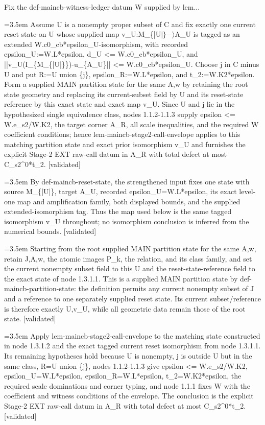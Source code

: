 \documentclass{article}
\newcommand{\step}[1]{\par\noindent\hangindent=3.5em\hangafter=1%
  \makebox[3.5em][l]{\textbf{#1.}}}
\newcommand{\steptag}[1]{\hfill{\small\textsf{[#1]}}}
\begin{document}
\begin{proofbox}{Fix the def-maincb-witness-ledger datum W supplied by lem...}
\step{1.3.1} Assume U is a nonempty proper subset of C and fix exactly one current reset state on U whose supplied map v\_U:M\_\{|U$|\}-\rangle$A\_U is tagged as an extended W.c0\_cb*epsilon\_U-isomorphism, with recorded epsilon\_U:=W.L*epsilon, d\_U <= W.c0\_cb*epsilon\_U, and ||v\_U(I\_\{M\_\{|U|\}\})-u\_\{A\_U\}|| <= W.c0\_cb*epsilon\_U. Choose j in C minus U and put R:=U union \{j\}, epsilon\_R:=W.L*epsilon, and t\_2:=W.K2*epsilon. Form a supplied MAIN partition state for the same A,w by retaining the root state geometry and replacing its current-subset field by U and its reset-state reference by this exact state and exact map v\_U. Since U and j lie in the hypothesized single equivalence class, nodes 1.1.2-1.1.3 supply epsilon <= W.e\_s2/W.K2, the target corner A\_R, all scale inequalities, and the required W coefficient conditions; hence lem-maincb-stage2-call-envelope applies to this matching partition state and exact prior isomorphism v\_U and furnishes the explicit Stage-2 EXT raw-call datum in A\_R with total defect at most C\_s2\textasciicircum{}0*t\_2. \steptag{validated} \\[6pt]
\step{1.3.1.1} By def-maincb-reset-state, the strengthened input fixes one state with source M\_\{|U|\}, target A\_U, recorded epsilon\_U=W.L*epsilon, its exact level-one map and amplification family, both displayed bounds, and the supplied extended-isomorphism tag. Thus the map used below is the same tagged isomorphism v\_U throughout; no isomorphism conclusion is inferred from the numerical bounds. \steptag{validated} \\[4pt]
\step{1.3.1.2} Starting from the root supplied MAIN partition state for the same A,w, retain J,A,w, the atomic images P\_k, the relation, and its class family, and set the current nonempty subset field to this U and the reset-state-reference field to the exact state of node 1.3.1.1. This is a supplied MAIN partition state by def-maincb-partition-state: the definition permits any current nonempty subset of J and a reference to one separately supplied reset state. Its current subset/reference is therefore exactly U,v\_U, while all geometric data remain those of the root state. \steptag{validated} \\[4pt]
\step{1.3.1.3} Apply lem-maincb-stage2-call-envelope to the matching state constructed in node 1.3.1.2 and the exact tagged current reset isomorphism from node 1.3.1.1. Its remaining hypotheses hold because U is nonempty, j is outside U but in the same class, R=U union \{j\}, nodes 1.1.2-1.1.3 give epsilon <= W.e\_s2/W.K2, epsilon\_U=W.L*epsilon, epsilon\_R=W.L*epsilon, t\_2=W.K2*epsilon, the required scale dominations and corner typing, and node 1.1.1 fixes W with the coefficient and witness conditions of the envelope. The conclusion is the explicit Stage-2 EXT raw-call datum in A\_R with total defect at most C\_s2\textasciicircum{}0*t\_2. \steptag{validated} \\[4pt]

\end{proofbox}
\end{document}
